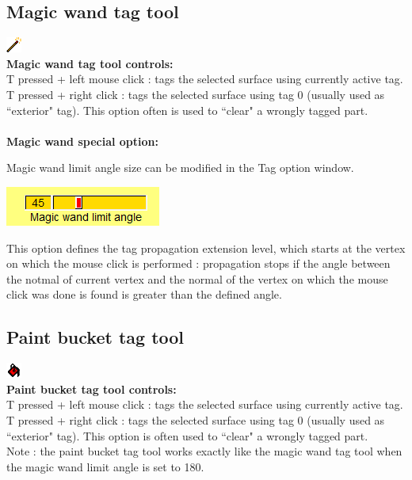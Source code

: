 \subsection{Magic wand tag tool}
\includegraphics[scale=0.7]{images/pixmap/magic_wand.png}\\
\textbf{Magic wand tag tool controls:}\\
T pressed + left mouse click : tags the selected surface using currently active tag.
T pressed + right click : tags the selected surface using tag 0 (usually used as ``exterior" tag). This option often is used to ``clear" a wrongly tagged part.\\
\\
\noindent
\textbf{Magic wand special option:}\\
\noindent
\begin{minipage}{0.6\textwidth}
Magic wand limit angle size can be modified in the Tag option window.
\end{minipage}    
\begin{minipage}{0.4\textwidth}\centering
  \includegraphics[scale=0.5]{images/Tags/Magic_wand_options.png}
 \end{minipage} 
\noindent
 This option defines the tag propagation extension level, which starts at the vertex on which the mouse click is performed : propagation stops if the angle between the notmal of current vertex and the normal of the vertex on which the mouse click was done is found is greater than the defined
angle.



\subsection{Paint bucket tag tool}
\includegraphics[scale=0.7]{images/pixmap/Flood_fill.png}\\
\textbf{Paint bucket tag tool controls:}\\
T pressed + left mouse click : tags the selected surface using currently active tag.\\
T pressed + right click : tags the selected surface using tag 0 (usually used as ``exterior" tag). This option is often used to ``clear" a wrongly tagged part.\\ 
Note : the paint bucket tag tool works exactly like the magic wand tag tool when the magic wand limit angle is set to 180\degree.


